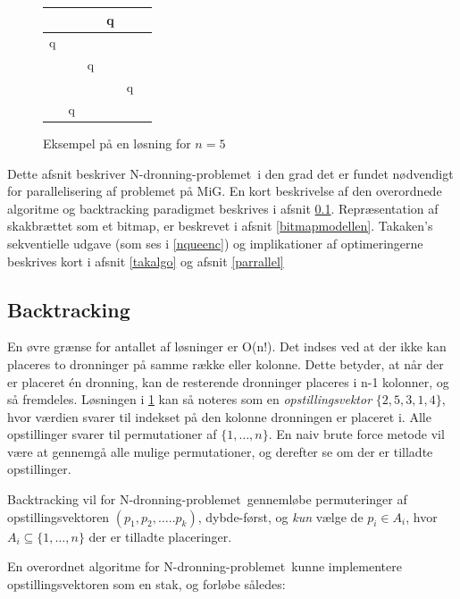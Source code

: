 \documentclass[draft,a4paper,11pt]{article}
\newcommand{\mig}{MiG}
\newcommand{\nq}{N-dronning-problemet}
\def\chs#1{{\chessfont#1}}
\begin{document}
\begin{figure}
\begin{center}
\begin{tabular}{|c|c|c|c|c|c}
\hline	 &  & &   \chs{q} & \\
\hline	\chs{q} & &  &  & \\
\hline	 & & \chs{q} &  &  \\
\hline	 &  &  & & \chs{q} \\
\hline	 & \chs{q} & &  &  \\
\hline
\end{tabular}
\end{center}
\caption{Eksempel på en løsning for $n=5$}
\label{fig:nq5eks}
\end{figure}

Dette afsnit beskriver \nq\ i den grad det er fundet nødvendigt for parallelisering af problemet på \mig. En kort beskrivelse af den overordnede algoritme og backtracking paradigmet beskrives i afsnit \ref{backtracking}. Repræsentation af skakbrættet som et bitmap, er beskrevet i afsnit \ref{bitmapmodellen}. Takaken's sekventielle udgave (som ses i \ref{nqueenc}) og implikationer af optimeringerne beskrives kort i afsnit \ref{takalgo} og afsnit \ref{parrallel}


\subsection{Backtracking}\label{backtracking}

En øvre grænse for antallet af løsninger er O(n!). Det indses ved at der ikke kan placeres to dronninger på samme række eller kolonne. Dette betyder, at når der er placeret én dronning, kan de resterende dronninger placeres i n-1 kolonner, og så fremdeles. Løsningen i \ref{fig:nq5eks} kan så noteres som en \emph{opstillingsvektor} $\{2,5,3,1,4\}$, hvor værdien svarer til indekset på den kolonne dronningen er placeret i. Alle opstillinger svarer til permutationer af $\{1,\ldots,n\}$. En naiv brute force metode vil være at gennemgå alle mulige permutationer, og derefter se om der er tilladte opstillinger.

Backtracking vil for \nq\ gennemløbe permuteringer af opstillingsvektoren  $(p_1,p_2,\ldots..p_k)$, dybde-først, og \emph{kun} vælge de $p_i \in A_i$, hvor $A_i\subseteq \{1,\ldots,n\}$ der er tilladte placeringer. 

En overordnet algoritme for \nq\ kunne implementere opstillingsvektoren som en stak, og forløbe således:
\end{document}
